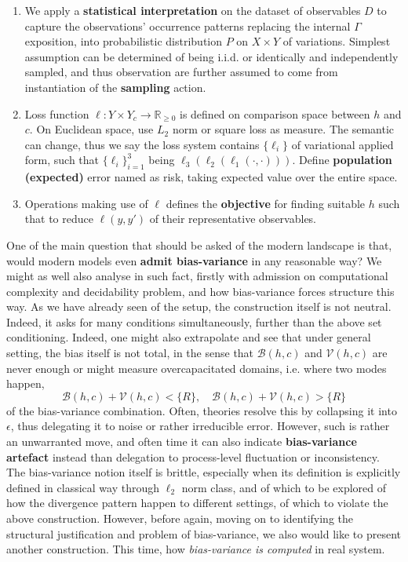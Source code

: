 \begin{construction}
\begin{enumerate}[itemsep=0pt,topsep=1pt]
    \item We apply a \textbf{statistical interpretation} on the dataset of observables $D$ to capture the observations' occurrence patterns replacing the internal $\Gamma$ exposition, into probabilistic distribution $P$ on $X\times Y$ of variations. Simplest assumption can be determined of being i.i.d. or identically and independently sampled, and thus observation are further assumed to come from instantiation of the \textbf{sampling} action. 
    \item Loss function $\ell: Y\times Y_{c}\to \mathbb{R}_{\geq 0}$ is defined on comparison space between $h$ and $c$. On Euclidean space, use $L_{2}$ norm or square loss as measure. The semantic can change, thus we say the loss system contains $\{\ell_{i}\}$ of variational applied form, such that $\{\ell_{i}\}^{3}_{i=1}$ being $\ell_{3}(\ell_{2}(\ell_{1}(\cdot,\cdot)))$. Define \textbf{population (expected)} error named as risk, taking expected value over the entire space.
    \item Operations making use of $\ell$ defines the \textbf{objective} for finding suitable $h$ such that to reduce $\ell(y,y')$ of their representative observables. 
\end{enumerate}
\end{construction}

One of the main question that should be asked of the modern landscape is that, would modern models even \textbf{admit bias-variance} in any reasonable way? We might as well also analyse in such fact, firstly with admission on computational complexity and decidability problem, and how bias-variance forces structure this way. As we have already seen of the setup, the construction itself is not neutral. Indeed, it asks for many conditions simultaneously, further than the above set conditioning. Indeed, one might also extrapolate and see that under general setting, the bias itself is not total, in the sense that $\mathcal{B}(h,c)$ and $\mathcal{V}(h,c)$ are never enough or might measure overcapacitated domains, i.e. where two modes happen,
\begin{equation}
  \mathcal{B}(h,c) + \mathcal{V}(h,c) < \{R\}, \quad \mathcal{B}(h,c) + \mathcal{V}(h,c) > \{R\}
\end{equation}
of the bias-variance combination. Often, theories resolve this by collapsing it into $\epsilon$, thus delegating it to noise or rather irreducible error. However, such is rather an unwarranted move, and often time it can also indicate \textbf{bias-variance artefact} instead than delegation to process-level fluctuation or inconsistency. The bias-variance notion itself is brittle, especially when its definition is explicitly defined in classical way through $\ell_{2}$ norm class, and of which to be explored of how the divergence pattern happen to different settings, of which to violate the above construction. However, before again, moving on to identifying the structural justification and problem of bias-variance, we also would like to present another construction. This time, how \textit{bias-variance is computed} in real system. 

